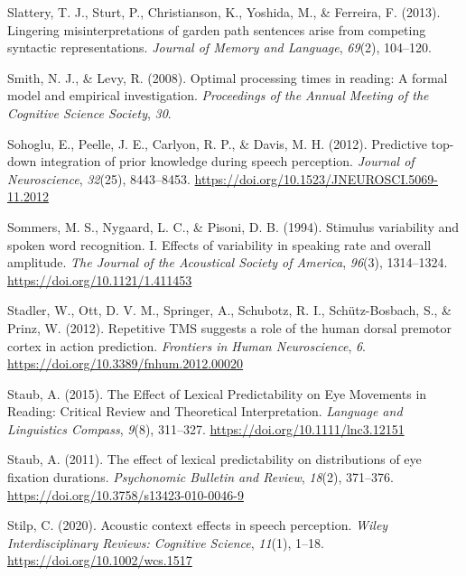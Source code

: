 \documentclass[a4paper, nobind]{templates/ociamthesis}
\newlength{\cslhangindent}
\newenvironment{CSLReferences}[2] %
 {%
  \setlength{\parindent}{0pt}
  \ifodd #1
  \let\oldpar\par
  \def\par{\hangindent=\cslhangindent\oldpar}
  \fi
  \setlength{\parskip}{1mm}
  \setlength{\baselineskip}{6mm}
 }%
 {}
\begin{document}
\begin{CSLReferences}{1}{0}
\leavevmode{}%
Slattery, T. J., Sturt, P., Christianson, K., Yoshida, M., \& Ferreira, F. (2013). Lingering misinterpretations of garden path sentences arise from competing syntactic representations. \emph{Journal of Memory and Language}, \emph{69}(2), 104--120.

\leavevmode{}%
Smith, N. J., \& Levy, R. (2008). Optimal processing times in reading: A formal model and empirical investigation. \emph{Proceedings of the Annual Meeting of the Cognitive Science Society}, \emph{30}.

\leavevmode{}%
Sohoglu, E., Peelle, J. E., Carlyon, R. P., \& Davis, M. H. (2012). {Predictive top-down integration of prior knowledge during speech perception}. \emph{Journal of Neuroscience}, \emph{32}(25), 8443--8453. \url{https://doi.org/10.1523/JNEUROSCI.5069-11.2012}

\leavevmode{}%
Sommers, M. S., Nygaard, L. C., \& Pisoni, D. B. (1994). Stimulus variability and spoken word recognition. I. Effects of variability in speaking rate and overall amplitude. \emph{The Journal of the Acoustical Society of America}, \emph{96}(3), 1314--1324. \url{https://doi.org/10.1121/1.411453}

\leavevmode{}%
Stadler, W., Ott, D. V. M., Springer, A., Schubotz, R. I., Schütz-Bosbach, S., \& Prinz, W. (2012). Repetitive TMS suggests a role of the human dorsal premotor cortex in action prediction. \emph{Frontiers in Human Neuroscience}, \emph{6}. \url{https://doi.org/10.3389/fnhum.2012.00020}

\leavevmode{}%
Staub, A. (2015). The Effect of Lexical Predictability on Eye Movements in Reading: Critical Review and Theoretical Interpretation. \emph{Language and Linguistics Compass}, \emph{9}(8), 311--327. \url{https://doi.org/10.1111/lnc3.12151}

\leavevmode{}%
Staub, A. (2011). {The effect of lexical predictability on distributions of eye fixation durations}. \emph{Psychonomic Bulletin and Review}, \emph{18}(2), 371--376. \url{https://doi.org/10.3758/s13423-010-0046-9}

\leavevmode{}%
Stilp, C. (2020). {Acoustic context effects in speech perception}. \emph{Wiley Interdisciplinary Reviews: Cognitive Science}, \emph{11}(1), 1--18. \url{https://doi.org/10.1002/wcs.1517}


\end{CSLReferences}
\end{document}

